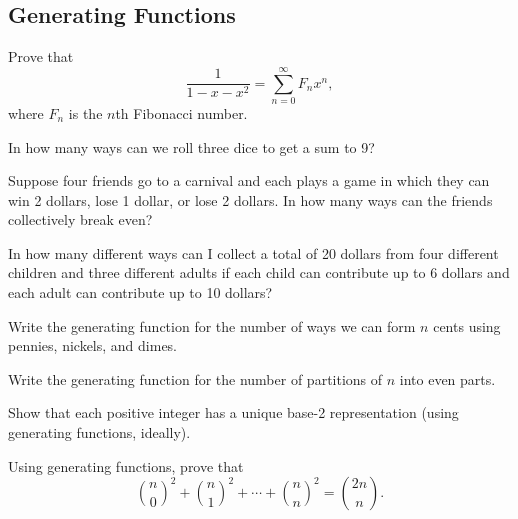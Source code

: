 \documentclass[12pt]{article}
\begin{document}
    \subsection{Generating Functions}

        \begin{exercise}
        Prove that 
        \[\frac{1}{1-x-x^2} = \sum_{n=0}^\infty F_n x^n,\]
        where \(F_n\) is the \(n\)th Fibonacci number.
        \end{exercise}
        
        \begin{exercise}
        In how many ways can we roll three dice to get a sum to 9?
        \end{exercise}
        
        \begin{exercise}
        Suppose four friends go to a carnival and each plays a game in which they can win 2 dollars, lose 1 dollar, or lose 2 dollars.
        In how many ways can the friends collectively break even?
        \end{exercise}
        
        \begin{exercise}
        In how many different ways can I collect a total of 20 dollars from four different children and three different adults if each child can contribute up to 6 dollars and each adult can contribute up to 10 dollars?
        \end{exercise}
        
        \begin{exercise}
        Write the generating function for the number of ways we can form \(n\) cents using pennies, nickels, and dimes.
        \end{exercise}
        
        \begin{exercise}
        Write the generating function for the number of partitions of \(n\) into even parts.
        \end{exercise}
        
        \begin{exercise}
        Show that each positive integer has a unique base-2 representation (using generating functions, ideally).
        \end{exercise}
        
        \begin{exercise}
        Using generating functions, prove that 
        \[\binom{n}{0}^2 + \binom{n}{1}^2 + \cdots + \binom{n}{n}^2 = \binom{2n}{n}.\]
        \end{exercise}
        
\end{document}
